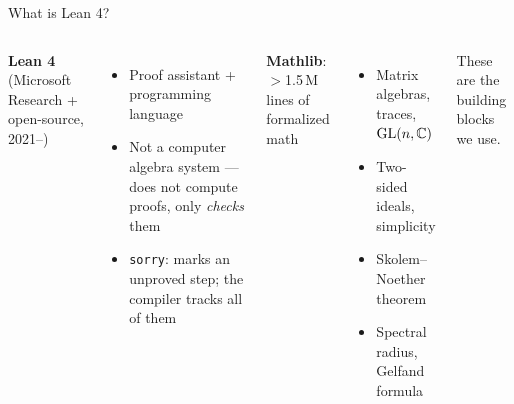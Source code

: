 \documentclass[aspectratio=169,10pt]{beamer}
\begin{document}
\begin{frame}{What is Lean 4?}
    \vspace{-0.3em}
    \begin{columns}[T]
        \small
        \textbf{Lean 4} (Microsoft Research + open-source, 2021--)
        \begin{itemize}\itemsep0.15em
            \item Proof assistant + programming language
            \item \textcolor{amber}{Not} a computer algebra system --- does not compute proofs, only \emph{checks} them
            \item \texttt{\textcolor{softred}{sorry}}: marks an unproved step;
                  the compiler tracks all of them
        \end{itemize}

        \small
        \textbf{Mathlib}: $>$1.5\,M lines of formalized math
        \begin{itemize}\itemsep0.15em
            \item Matrix algebras, traces, $\mathrm{GL}(n,\mathbb{C})$
            \item Two-sided ideals, simplicity
            \item Skolem--Noether theorem
            \item Spectral radius, Gelfand formula
        \end{itemize}

        \vspace{0.3em}
        These are the building blocks we use.
    \end{columns}
\end{frame}
\end{document}
